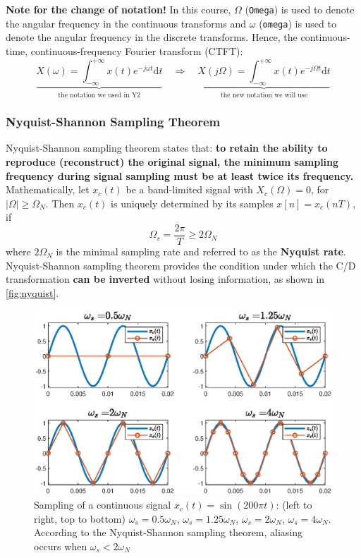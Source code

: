 \begin{mdframed}
\color{gray} 
\textbf{Note for the change of notation!} In this course, $\Omega$ (\texttt{Omega}) is used to denote the angular frequency in the continuous transforms and $\omega$ (\texttt{omega}) is used to denote the angular frequency in the discrete transforms. Hence, the continuous-time, continuous-frequency Fourier transform (CTFT):
\[
    \underbrace{X(\omega) = \int_{-\infty}^{+\infty} x(t) e^{-j\omega t} \mathrm{d}t}_{\text{the notation we used in Y2}}
    \quad \Rightarrow \quad 
    \underbrace{X(j\Omega) = \int_{-\infty}^{+\infty} x(t) e^{-j\Omega t} \mathrm{d}t}_{\text{the new notation we will use}}
\]
\end{mdframed}

\subsubsection{Nyquist-Shannon Sampling Theorem}
Nyquist-Shannon sampling theorem states that: \textbf{to retain the ability to reproduce (reconstruct) the original signal, the minimum sampling frequency during signal sampling must be at least twice its frequency.}\\

Mathematically, let $x_{c}(t)$ be a band-limited signal with $X_{c}(\Omega)=0$, for $\lvert \Omega \rvert \geq \Omega_{N}$. Then $x_{c}(t)$ is uniquely determined by its samples $x[n] = x_{c}(nT)$, if 
\[ \Omega_{s}=\frac{2\pi}{T} \geq 2\Omega_{N} \]
where $2\Omega_{N}$ is the minimal sampling rate and referred to as the \textbf{Nyquist rate}.\\

Nyquist-Shannon sampling theorem provides the condition under which the C/D transformation \textbf{can be inverted} without losing information, as shown in \autoref{fig:nyquist}.

\begin{figure}[H]
    \centering
    \includegraphics[width=.95\textwidth, center]{images/nyquist.eps}
    \caption{Sampling of a continuous signal $x_{c}(t)=\sin(200\pi t)$: (left to right, top to bottom) $\omega_{s}=0.5\omega_{N}$, $\omega_{s}=1.25\omega_{N}$, $\omega_{s}=2\omega_{N}$, $\omega_{s}=4\omega_{N}$. According to the Nyquist-Shannon sampling theorem, aliasing occurs when $\omega_{s} < 2\omega_{N}$}
    \label{fig:nyquist}
\end{figure}


